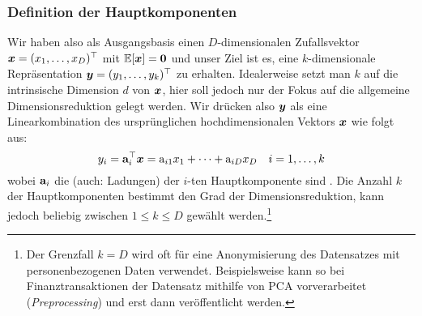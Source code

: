 \subsubsection{Definition der Hauptkomponenten}
\label{ch:MethodenDerDimRed:traditionell:PCA:Definition}
Wir haben also als Ausgangsbasis einen $D$-dimensionalen Zufallsvektor $\bm{x} = (x_1, \ldots, x_D)^\top$ mit $\operatorname{\mathbb{E}}[\bm{x}] = \mathbf{0}$ und unser Ziel ist es, eine $k$-dimensionale Repräsentation $\bm{y} = (y_1,\ldots,y_k)^\top$ zu erhalten. Idealerweise setzt man $k$ auf die intrinsische Dimension $d$ von $\bm{x}$, hier soll jedoch nur der Fokus auf die allgemeine Dimensionsreduktion gelegt werden. Wir drücken also $\bm{y}$ als eine Linearkombination des ursprünglichen hochdimensionalen Vektors $\bm{x}$ wie folgt aus:
\begin{equation}
	y_i = \mathbf{a}_i^\top \bm{x} = \textnormal{a}_{i1} x_1 + \cdots + \textnormal{a}_{iD} x_D
	\quad i = 1,\ldots,k
\end{equation}
wobei $\mathbf{a}_i$ die  (auch: Ladungen) der $i$-ten Hauptkomponente sind \parencite[vgl.][2]{Jolliffe.2002}. Die Anzahl $k$ der Hauptkomponenten bestimmt den Grad der
Dimensionsreduktion, kann jedoch beliebig zwischen $1 \leq k \leq D$ gewählt werden.\footnote{Der
	Grenzfall $k = D$ wird oft für eine Anonymisierung des Datensatzes mit personenbezogenen Daten
	verwendet. Beispielsweise kann so bei Finanztransaktionen der Datensatz mithilfe von PCA
	vorverarbeitet (\textit{Preprocessing}) und erst dann veröffentlicht werden.}

